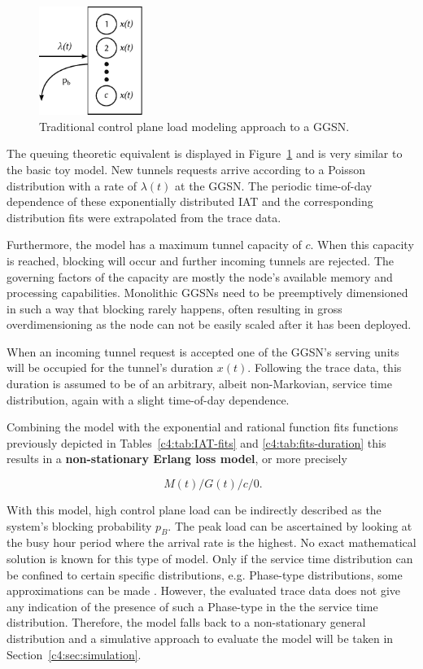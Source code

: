 \begin{figure}[htb]
	\centering
	\includegraphics[width=0.3\textwidth]{images/ggsn-monolithic.pdf}
	\caption{Traditional control plane load modeling approach to a \acrshort{GGSN}.}
\label{c4:fig:model-ggsn-monolithic}
\end{figure}

The queuing theoretic equivalent is displayed in Figure~\ref{c4:fig:model-ggsn-monolithic} and is very similar to the basic toy model. New tunnels requests arrive according to a Poisson distribution with a rate of $\lambda(t)$ at the \gls{GGSN}. The periodic time-of-day dependence of these exponentially distributed \gls{IAT} and the corresponding distribution fits were extrapolated from the trace data.

Furthermore, the model has a maximum tunnel capacity of $c$. When this capacity is reached, blocking will occur and further incoming tunnels are rejected. The governing factors of the capacity are mostly the node's available memory and processing capabilities. Monolithic \glspl{GGSN} need to be preemptively dimensioned in such a way that blocking rarely happens, often resulting in gross overdimensioning as the node can not be easily scaled after it has been deployed.

When an incoming tunnel request is accepted one of the \gls{GGSN}'s serving units will be occupied for the tunnel's duration $x(t)$. Following the trace data, this duration is assumed to be of an arbitrary, albeit non-Markovian, service time distribution, again with a slight time-of-day dependence.

Combining the model with the exponential and rational function fits functions previously depicted in Tables~\ref{c4:tab:IAT-fits} and \ref{c4:tab:fits-duration} this results in a \textbf{non-stationary Erlang loss model}, or more precisely

\begin{equation}
	\phantom{.}M(t)/G(t)/c/0\text{.}
\end{equation}

With this model, high control plane load can be indirectly described as the system's blocking probability $p_B$. The peak load can be ascertained by looking at the busy hour period where the arrival rate is the highest. No exact mathematical solution is known for this type of model. Only if the service time distribution can be confined to certain specific distributions, e.g. Phase-type distributions, some approximations can be made \cite{davis1995nonstationaryerlang}. 
However, the evaluated trace data does not give any indication of the presence of such a Phase-type in the the service time distribution. Therefore, the model falls back to a non-stationary general distribution  and a simulative approach to evaluate the model will be taken in Section~\ref{c4:sec:simulation}.


